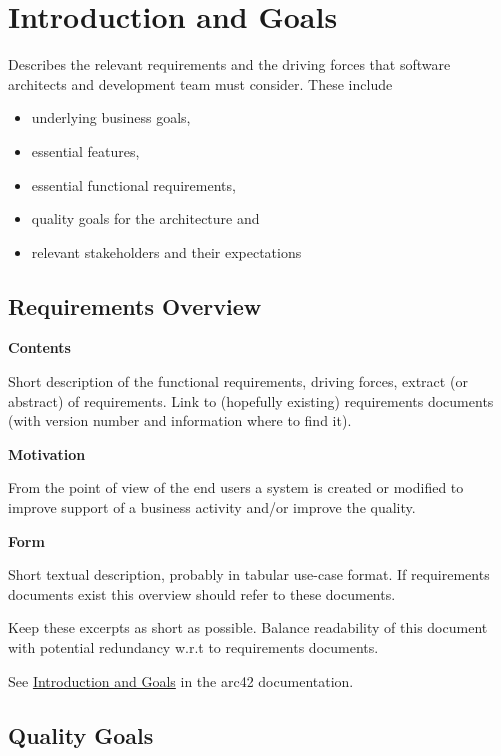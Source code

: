 \hypertarget{section-introduction-and-goals}{%
\section{Introduction and Goals}\label{section-introduction-and-goals}}

Describes the relevant requirements and the driving forces that software
architects and development team must consider. These include

\begin{itemize}
\item
  underlying business goals,
\item
  essential features,
\item
  essential functional requirements,
\item
  quality goals for the architecture and
\item
  relevant stakeholders and their expectations
\end{itemize}

\hypertarget{_requirements_overview}{%
\subsection{Requirements Overview}\label{_requirements_overview}}

\textbf{Contents}

Short description of the functional requirements, driving forces,
extract (or abstract) of requirements. Link to (hopefully existing)
requirements documents (with version number and information where to
find it).

\textbf{Motivation}

From the point of view of the end users a system is created or modified
to improve support of a business activity and/or improve the quality.

\textbf{Form}

Short textual description, probably in tabular use-case format. If
requirements documents exist this overview should refer to these
documents.

Keep these excerpts as short as possible. Balance readability of this
document with potential redundancy w.r.t to requirements documents.

See \href{https://docs.arc42.org/section-1/}{Introduction and Goals} in
the arc42 documentation.

\hypertarget{_quality_goals}{%
\subsection{Quality Goals}\label{_quality_goals}}

